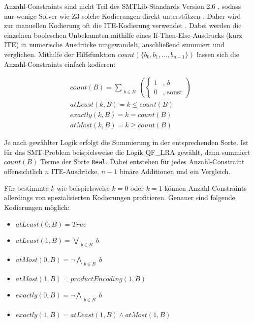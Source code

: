 Anzahl-Constraints sind nicht Teil des SMTLib-Standards Version 2.6 \cite{smtlib}, sodass nur wenige Solver wie Z3 solche Kodierungen direkt unterstützen \cite{z3Cardinality}.
Daher wird zur manuellen Kodierung oft die ITE-Kodierung verwendet \cite{kovasznai}.
Dabei werden die einzelnen booleschen Unbekannten mithilfe eines If-Then-Else-Ausdrucks (kurz ITE) in numerische Ausdrücke umgewandelt, anschließend summiert und verglichen.
Mithilfe der Hilfsfunktion $count(\{b_0, b_1, \ldots, b_{n-1}\})$ lassen sich die Anzahl-Constraints einfach kodieren:

\[
    \begin{aligned}
        & count(B) = \sum_{\substack{b \in B}}
            \left(
                \begin{cases}
                    1 & \text{, } b \\
                    0 & \text{, sonst}
                \end{cases}
            \right) \\[5pt]
        & atLeast(k, B) = k \leq count(B) \\[5pt]
        & exactly(k, B) = k = count(B) \\[5pt]
        & atMost(k, B) = k \geq count(B)
    \end{aligned}
\]

Je nach gewählter Logik erfolgt die Summierung in der entsprechenden Sorte.
Ist für das SMT-Problem beispielsweise die Logik QF\_LRA gewählt, dann summiert $count(B)$ Terme der Sorte \texttt{Real}.
Dabei entstehen für jedes Anzahl-Constraint offensichtlich $n$ ITE-Ausdrücke, $n-1$ binäre Additionen und ein Vergleich.

Für bestimmte $k$ wie beispielsweise $k = 0$ oder $k = 1$ können Anzahl-Constraints allerdings von spezialisierten Kodierungen profitieren.
Genauer sind folgende Kodierungen möglich:
\begin{itemize}
    \item $atLeast(0,B) = True$
    \item $atLeast(1,B) = \bigvee\limits_{\substack{b \in B}} b $
    \item $atMost(0,B) = \neg\bigwedge\limits_{\substack{b \in B}} b$
    \item $atMost(1,B) = productEncoding(1,B)$
    \item $exactly(0,B) = \neg\bigwedge\limits_{\substack{b \in B}} b$
    \item $exactly(1,B) = atLeast(1,B) \land atMost(1,B)$
\end{itemize}

